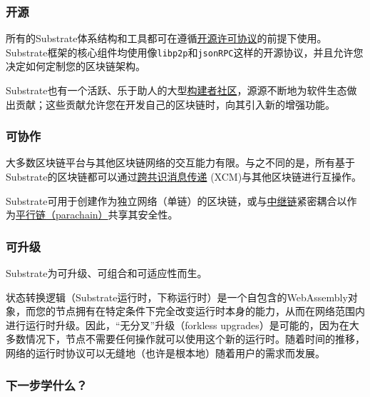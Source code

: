 \hypertarget{ux5f00ux6e90}{%
\subsubsection{开源}\label{ux5f00ux6e90}}

所有的Substrate体系结构和工具都可在遵循\href{https://github.com/paritytech/substrate\#license}{开源许可协议}的前提下使用。Substrate框架的核心组件均使用像\texttt{libp2p}和\texttt{jsonRPC}这样的开源协议，并且允许您决定如何定制您的区块链架构。

Substrate也有一个活跃、乐于助人的大型\href{https://substrate.io/ecosystem/}{构建者社区}，源源不断地为软件生态做出贡献；这些贡献允许您在开发自己的区块链时，向其引入新的增强功能。

\hypertarget{ux53efux534fux4f5c}{%
\subsubsection{可协作}\label{ux53efux534fux4f5c}}

大多数区块链平台与其他区块链网络的交互能力有限。与之不同的是，所有基于Substrate的区块链都可以通过\href{https://wiki.polkadot.network/docs/learn-crosschain}{跨共识消息传递}
(XCM)与其他区块链进行互操作。

Substrate可用于创建作为独立网络（单链）的区块链，或与\href{https://wiki.polkadot.network/docs/learn-architecture\#relay-chain}{中继链}紧密耦合以作为\href{https://wiki.polkadot.network/docs/learn-parachains}{平行链（parachain）}共享其安全性。

\hypertarget{ux53efux5347ux7ea7}{%
\subsubsection{可升级}\label{ux53efux5347ux7ea7}}

Substrate为可升级、可组合和可适应性而生。

状态转换逻辑（Substrate运行时，下称运行时）是一个自包含的WebAssembly对象，而您的节点拥有在特定条件下完全改变运行时本身的能力，从而在网络范围内进行运行时升级。因此，``无分叉''升级（forkless
upgrades）是可能的，因为在大多数情况下，节点不需要任何操作就可以使用这个新的运行时。随着时间的推移，网络的运行时协议可以无缝地（也许是根本地）随着用户的需求而发展。

\hypertarget{ux4e0bux4e00ux6b65ux5b66ux4ec0ux4e48}{%
\subsubsection{下一步学什么？}\label{ux4e0bux4e00ux6b65ux5b66ux4ec0ux4e48}}


